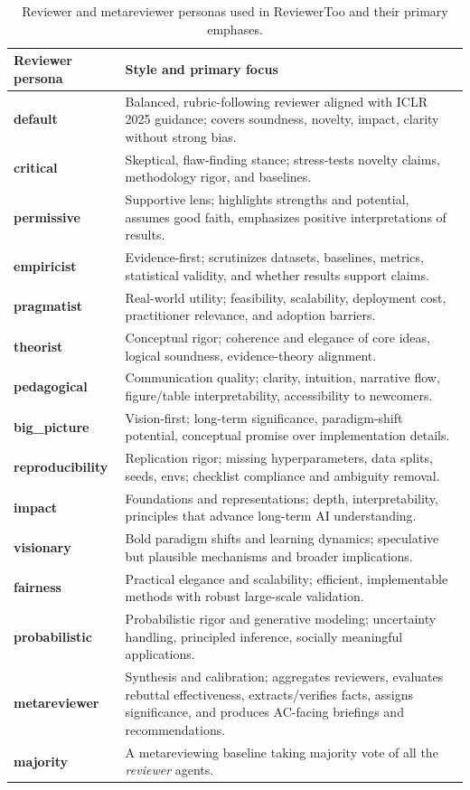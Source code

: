 \documentclass{article} %
\begin{document}
\begin{table}[t]
\centering
\small
\renewcommand{\arraystretch}{1.1}
\begin{tabularx}{\linewidth}{l X}
\toprule
\textbf{Reviewer persona} & \textbf{Style and primary focus} \\
\midrule
\textbf{default} & Balanced, rubric-following reviewer aligned with ICLR 2025 guidance; covers soundness, novelty, impact, clarity without strong bias. \\
\textbf{critical} & Skeptical, flaw-finding stance; stress-tests novelty claims, methodology rigor, and baselines. \\
\textbf{permissive} & Supportive lens; highlights 
strengths and potential, assumes good faith, emphasizes positive interpretations of results. \\
\midrule
\textbf{empiricist} & Evidence-first; scrutinizes datasets, baselines, metrics, statistical validity, and whether results support claims. \\
\textbf{pragmatist} & Real-world utility; feasibility, scalability, deployment cost, practitioner relevance, and adoption barriers. \\
\textbf{theorist} & Conceptual rigor; coherence and elegance of core ideas, logical soundness, evidence-theory alignment. \\
\midrule
\textbf{pedagogical} & Communication quality; clarity, intuition, narrative flow, figure/table interpretability, accessibility to newcomers. \\
\textbf{big\_picture} & Vision-first; long-term significance, paradigm-shift potential, conceptual promise over implementation details. \\
\textbf{reproducibility} & Replication rigor; missing hyperparameters, data splits, seeds, envs; checklist compliance and ambiguity removal. \\
\midrule
\textbf{impact} & Foundations and representations; depth, interpretability, principles that advance long-term AI understanding. \\
\textbf{visionary} & Bold paradigm shifts and learning dynamics; speculative but plausible mechanisms and broader implications. \\
\textbf{fairness} & Practical elegance and scalability; efficient, implementable methods with robust large-scale validation. \\
\textbf{probabilistic} & Probabilistic rigor and generative modeling; uncertainty handling, principled inference, socially meaningful applications. \\
\midrule
\textbf{metareviewer} & Synthesis and calibration; aggregates reviewers, evaluates rebuttal effectiveness, extracts/verifies facts, assigns significance, and produces AC-facing briefings and recommendations. \\
\textbf{majority} & A metareviewing baseline taking majority vote of all the \textit{reviewer} agents. \\
\bottomrule
\end{tabularx}
\caption{Reviewer and metareviewer personas used in ReviewerToo and their primary emphases.}
\label{tab:reviewer_personas}
\end{table}
\end{document}
